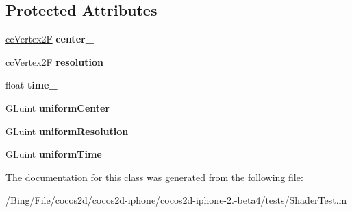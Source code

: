 \subsection*{Protected Attributes}
\begin{DoxyCompactItemize}
\item 
\hypertarget{interface_shader_node_a675c04ac3ed0b3cbae7f92d7b617b308}{\hyperlink{cc_types_8h_a3d0a9a02a1f9787a9ede91b9a74bf41f}{cc\-Vertex2\-F} {\bfseries center\-\_\-}}\label{interface_shader_node_a675c04ac3ed0b3cbae7f92d7b617b308}

\item 
\hypertarget{interface_shader_node_a63aa4f5a65670c2a4d33382ad8cb4471}{\hyperlink{cc_types_8h_a3d0a9a02a1f9787a9ede91b9a74bf41f}{cc\-Vertex2\-F} {\bfseries resolution\-\_\-}}\label{interface_shader_node_a63aa4f5a65670c2a4d33382ad8cb4471}

\item 
\hypertarget{interface_shader_node_a98cddc499db597588b3fe1fc3c167bfc}{float {\bfseries time\-\_\-}}\label{interface_shader_node_a98cddc499db597588b3fe1fc3c167bfc}

\item 
\hypertarget{interface_shader_node_ac47e409d1789a3d416863706a43f3796}{G\-Luint {\bfseries uniform\-Center}}\label{interface_shader_node_ac47e409d1789a3d416863706a43f3796}

\item 
\hypertarget{interface_shader_node_a365c0f35b1497d7ef533ca011b9de925}{G\-Luint {\bfseries uniform\-Resolution}}\label{interface_shader_node_a365c0f35b1497d7ef533ca011b9de925}

\item 
\hypertarget{interface_shader_node_aec5b7ad54761404604a361f6499154ef}{G\-Luint {\bfseries uniform\-Time}}\label{interface_shader_node_aec5b7ad54761404604a361f6499154ef}

\end{DoxyCompactItemize}


The documentation for this class was generated from the following file\-:\begin{DoxyCompactItemize}
\item 
/\-Bing/\-File/cocos2d/cocos2d-\/iphone/cocos2d-\/iphone-\/2.-\/beta4/tests/Shader\-Test.\-m\end{DoxyCompactItemize}
